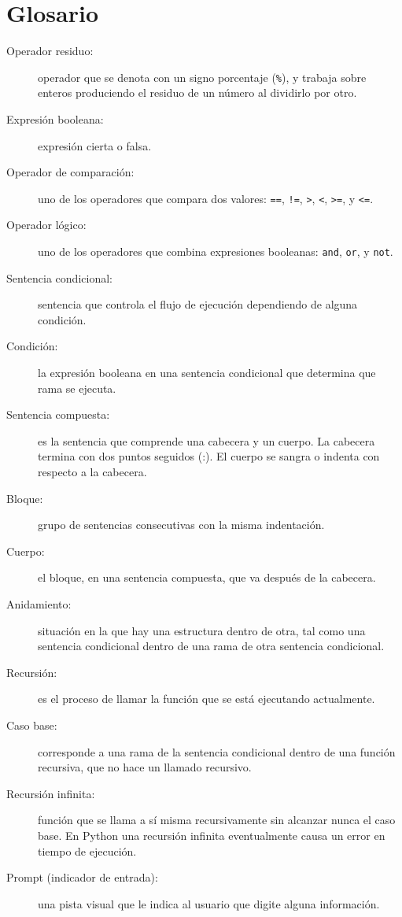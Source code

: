 \section{Glosario}
\begin{description}
\item [{Operador residuo:}] operador que se denota con un signo porcentaje
(\texttt{\%}), y trabaja sobre enteros produciendo el residuo de un
número al dividirlo por otro.
\item [{Expresión booleana:}] expresión cierta o falsa.
\item [{Operador de comparación:}] uno de los operadores que compara
dos valores: \texttt{==}, \texttt{!=}, \texttt{>}, \texttt{<}, \texttt{>=},
y \texttt{<=}.
\item [{Operador lógico:}] uno de los operadores que combina expresiones
booleanas: \texttt{and}, \texttt{or}, y \texttt{not}.
\item [{Sentencia condicional:}] sentencia que controla el flujo de ejecución
dependiendo de alguna condición.
\item [{Condición:}] la expresión booleana en una sentencia condicional
que determina que rama se ejecuta.
\item [{Sentencia compuesta:}] es la sentencia que comprende una cabecera
y un cuerpo. La cabecera termina con dos puntos seguidos (:). El cuerpo
se sangra o indenta con respecto a la cabecera.
\item [{Bloque:}] grupo de sentencias consecutivas con la misma indentación.
\item [{Cuerpo:}] el bloque, en una sentencia compuesta, que va después
de la cabecera.
\item [{Anidamiento:}] situación en la que hay una estructura dentro de
otra, tal como una sentencia condicional dentro de una rama de otra
sentencia condicional.
\item [{Recursión:}] es el proceso de llamar la función que se está ejecutando
actualmente.
\item [{Caso base:}] corresponde a una rama de la sentencia condicional
dentro de una función recursiva, que no hace un llamado recursivo.
\item [{Recursión infinita:}] función que se llama a sí misma recursivamente
sin alcanzar nunca el caso base. En Python una recursión infinita
eventualmente causa un error en tiempo de ejecución.
\item [{Prompt (indicador de entrada):}] una pista visual que le indica
al usuario que digite alguna información.

  
  
   
   
\end{description}

